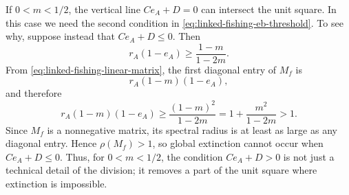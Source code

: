 \documentclass{article}
\numberwithin{equation}{section}
\begin{document}
If $0<m<1/2$, the vertical line $Ce_A+D=0$ can intersect the unit square.
In this case we need the second condition in
\eqref{eq:linked-fishing-eb-threshold}. To see why, suppose instead that
$Ce_A+D\leq0$. Then
\begin{equation*}
    r_A(1-e_A)\geq\frac{1-m}{1-2m}.
\end{equation*}
From \eqref{eq:linked-fishing-linear-matrix}, the first diagonal entry of
$M_f$ is
\begin{equation*}
    r_A(1-m)(1-e_A),
\end{equation*}
and therefore
\begin{equation*}
    r_A(1-m)(1-e_A)
    \geq
    \frac{(1-m)^2}{1-2m}
    =
    1+\frac{m^2}{1-2m}
    >1.
\end{equation*}
Since $M_f$ is a nonnegative matrix, its spectral radius is at least as
large as any diagonal entry. Hence $\rho(M_f)>1$, so global extinction
cannot occur when $Ce_A+D\leq0$. Thus, for $0<m<1/2$, the condition
$Ce_A+D>0$ is not just a technical detail of the division; it removes a
part of the unit square where extinction is impossible.
\end{document}
